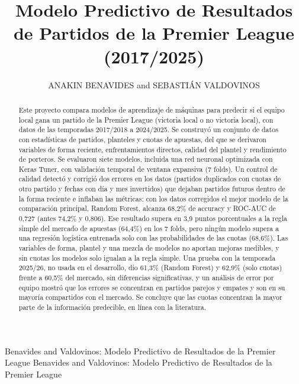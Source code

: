 \documentclass{ieeeaccess}
\begin{document}
\history{}
\doi{}

\title{Modelo Predictivo de Resultados de Partidos de la Premier League (2017/2025)}
\author{\uppercase{Anakin Benavides} and
\uppercase{Sebastián Valdovinos}}
\address[1]{Universidad Andrés Bello, Facultad de Ingeniería, Departamento de Ingeniería Civil Informática, Santiago, Chile}

\markboth
{Benavides and Valdovinos: Modelo Predictivo de Resultados de la Premier League}
{Benavides and Valdovinos: Modelo Predictivo de Resultados de la Premier League}


\begin{abstract}
Este proyecto compara modelos de aprendizaje de máquinas para predecir si el equipo local gana un partido de la Premier League (victoria local o no victoria local), con datos de las temporadas 2017/2018 a 2024/2025. Se construyó un conjunto de datos con estadísticas de partidos, planteles y cuotas de apuestas, del que se derivaron variables de forma reciente, enfrentamientos directos, calidad del plantel y rendimiento de porteros. Se evaluaron siete modelos, incluida una red neuronal optimizada con Keras Tuner, con validación temporal de ventana expansiva (7 folds). Un control de calidad detectó y corrigió dos errores en los datos (partidos duplicados con cuotas de otro partido y fechas con día y mes invertidos) que dejaban partidos futuros dentro de la forma reciente e inflaban las métricas: con los datos corregidos el mejor modelo de la comparación principal, Random Forest, alcanza 68,2\% de accuracy y ROC-AUC de 0,727 (antes 74,2\% y 0,806). Ese resultado supera en 3,9 puntos porcentuales a la regla simple del mercado de apuestas (64,4\%) en los 7 folds, pero ningún modelo supera a una regresión logística entrenada solo con las probabilidades de las cuotas (68,6\%). Las variables de forma, plantel y una mezcla de modelos no aportan mejoras medibles, y sin cuotas los modelos solo igualan a la regla simple. Una prueba con la temporada 2025/26, no usada en el desarrollo, dio 61,3\% (Random Forest) y 62,9\% (solo cuotas) frente a 60,5\% del mercado, sin diferencias significativas, y un análisis de error por equipo mostró que los errores se concentran en partidos parejos y empates y son en su mayoría compartidos con el mercado. Se concluye que las cuotas concentran la mayor parte de la información predecible, en línea con la literatura.
\end{abstract}
\end{document}
